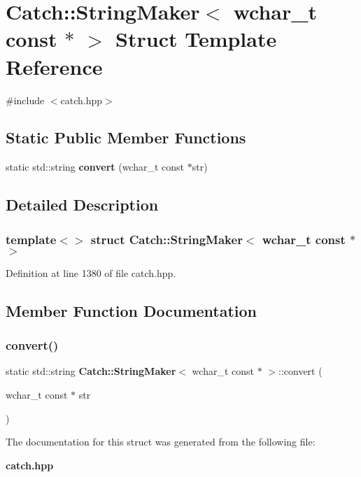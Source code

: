 \section{Catch\+::String\+Maker$<$ wchar\+\_\+t const $\ast$ $>$ Struct Template Reference}
\label{struct_catch_1_1_string_maker_3_01wchar__t_01const_01_5_01_4}


{\ttfamily \#include $<$catch.\+hpp$>$}

\subsection*{Static Public Member Functions}
\begin{DoxyCompactItemize}
\item 
static std\+::string \textbf{ convert} (wchar\+\_\+t const $\ast$str)
\end{DoxyCompactItemize}


\subsection{Detailed Description}
\subsubsection*{template$<$$>$\newline
struct Catch\+::\+String\+Maker$<$ wchar\+\_\+t const $\ast$ $>$}



Definition at line 1380 of file catch.\+hpp.



\subsection{Member Function Documentation}
\mbox{\label{struct_catch_1_1_string_maker_3_01wchar__t_01const_01_5_01_4_ae7535a1f417ace45ca05e4389334ffeb}} 
\subsubsection{convert()}
{\footnotesize\ttfamily static std\+::string \textbf{ Catch\+::\+String\+Maker}$<$ wchar\+\_\+t const $\ast$ $>$\+::convert (\begin{DoxyParamCaption}\item[{wchar\+\_\+t const $\ast$}]{str }\end{DoxyParamCaption})\hspace{0.3cm}{\ttfamily [static]}}



The documentation for this struct was generated from the following file\+:\begin{DoxyCompactItemize}
\item 
\textbf{ catch.\+hpp}\end{DoxyCompactItemize}
